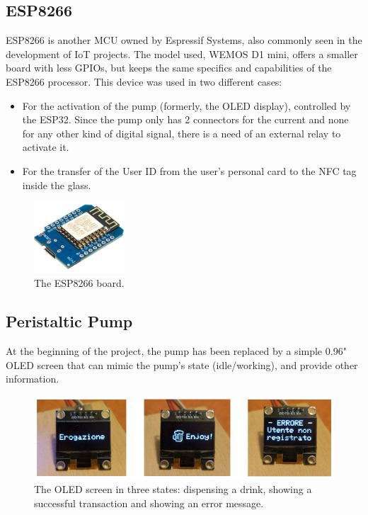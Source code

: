 \documentclass[target=bach,aauheader=,style=]{thud}
\begin{document}
\subsection{ESP8266}
ESP8266 is another MCU owned by Espressif Systems, also commonly seen in the development of IoT projects. The  model used, WEMOS D1 mini, offers a smaller board with less GPIOs, but keeps the same specifics and capabilities of the ESP8266 processor. This device was used in two different cases:
\begin{itemize}
	\item For the activation of the pump (formerly, the OLED display), controlled by the ESP32. Since the pump only has 2 connectors for the current and none for any other kind of digital signal, there is a need of an external relay to activate it.
	\item For the transfer of the User ID from the user's personal card to the NFC tag inside the glass.
\end{itemize}

\begin{figure}[h!]
	\centering
	\includegraphics[width=0.3\textwidth]{esp8266}
	\caption{The ESP8266 board.}
	\label{fig:esp8266}
\end{figure} 

\subsection{Peristaltic Pump}
At the beginning of the project, the pump has been replaced by a simple 0.96" OLED screen that can mimic the pump's state (idle/working), and provide other information.

\begin{figure}[h!]
	\centering
	\includegraphics[width=.85\textwidth]{screen_status}
	\caption{The OLED screen in three states: dispensing a drink, showing a successful transaction and showing an error message.}
	\label{fig:enjoy_screen}
\end{figure}
\end{document}
